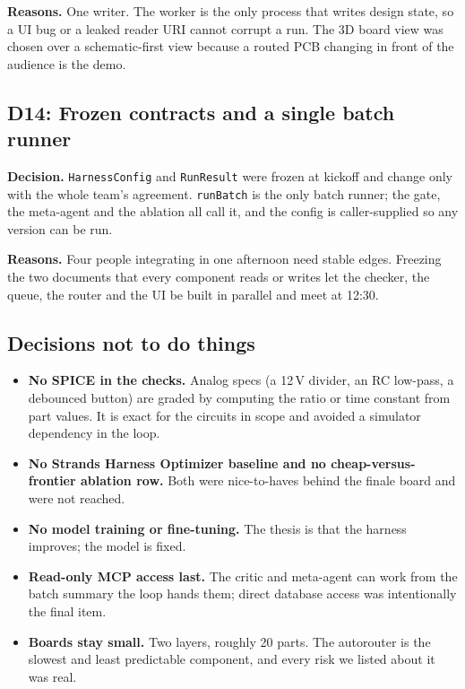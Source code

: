\documentclass[11pt,a4paper]{article}
\newcommand{\code}[1]{\texttt{#1}}
\begin{document}
\textbf{Reasons.} One writer. The worker is the only process that writes design state, so a UI bug or a leaked reader URI cannot corrupt a run. The 3D board view was chosen over a schematic-first view because a routed PCB changing in front of the audience is the demo.

\subsection{D14: Frozen contracts and a single batch runner}

\textbf{Decision.} \code{HarnessConfig} and \code{RunResult} were frozen at kickoff and change only with the whole team's agreement. \code{runBatch} is the only batch runner; the gate, the meta-agent and the ablation all call it, and the config is caller-supplied so any version can be run.

\textbf{Reasons.} Four people integrating in one afternoon need stable edges. Freezing the two documents that every component reads or writes let the checker, the queue, the router and the UI be built in parallel and meet at 12:30.

\subsection{Decisions not to do things}

\begin{itemize}
  \item \textbf{No SPICE in the checks.} Analog specs (a 12\,V divider, an RC low-pass, a debounced button) are graded by computing the ratio or time constant from part values. It is exact for the circuits in scope and avoided a simulator dependency in the loop.
  \item \textbf{No Strands Harness Optimizer baseline and no cheap-versus-frontier ablation row.} Both were nice-to-haves behind the finale board and were not reached.
  \item \textbf{No model training or fine-tuning.} The thesis is that the harness improves; the model is fixed.
  \item \textbf{Read-only MCP access last.} The critic and meta-agent can work from the batch summary the loop hands them; direct database access was intentionally the final item.
  \item \textbf{Boards stay small.} Two layers, roughly 20 parts. The autorouter is the slowest and least predictable component, and every risk we listed about it was real.
\end{itemize}
\end{document}
